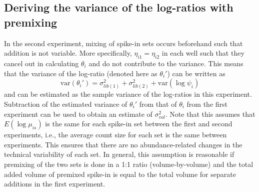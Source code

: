\documentclass{article}
\begin{document}
\subsection{Deriving the variance of the log-ratios with premixing}
In the second experiment, mixing of spike-in sets occurs beforehand such that addition is not variable.
More specifically, $\eta_{i1}=\eta_{i2}$ in each well such that they cancel out in calculating $\theta_i$ and do not contribute to the variance.
This means that the variance of the log-ratio (denoted here as $\theta_i'$) can be written as
\[
    \mbox{var}(\theta_i') = \sigma^2_{lib(1)} + \sigma^2_{lib(2)} + \mbox{var}(\log \psi_i)
\]
and can be estimated as the sample variance of the log-ratios in this experiment.
Subtraction of the estimated variance of $\theta_i'$ from that of $\theta_i$ from the first experiment can be used to obtain an estimate of $\sigma^2_{vol}$.
Note that this assumes that $E(\log \mu_{is})$ is the same for each spike-in set between the first and second experiments, i.e., the average count size for each set is the same between experiments.
This ensures that there are no abundance-related changes in the technical variability of each set.
In general, this assumption is reasonable if premixing of the two sets is done in a 1:1 ratio (volume-by-volume) and the total added volume of premixed spike-in is equal to the total volume for separate additions in the first experiment.

\end{document}
